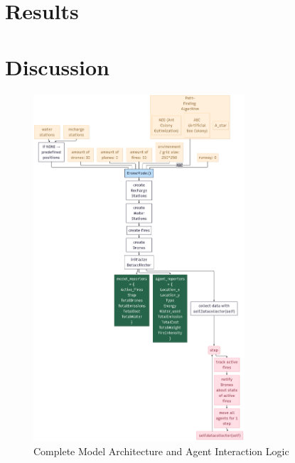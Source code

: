 \documentclass[11pt, a4paper]{article}
\begin{document}
\section{Results}






\section{Discussion}

\appendix
\label{app:modellogic}

\begin{figure}[H]
    \centering
    \includegraphics[width=0.7\textwidth]{figures/modellogic.png}
    \caption{Complete Model Architecture and Agent Interaction Logic}
    \label{fig:modellogic}
\end{figure}
\end{document}
